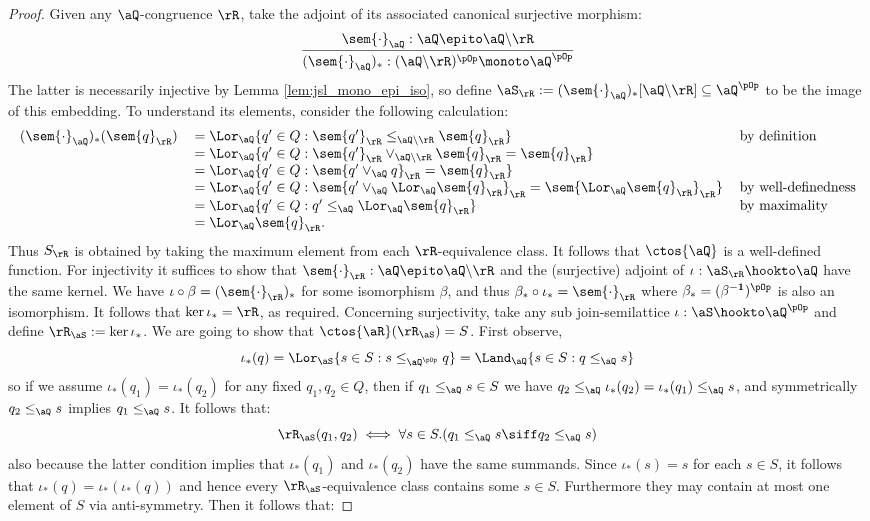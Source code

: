 \documentclass{article}
\begin{document}
\begin{proof}
\smallskip
Given any $\aQ$-congruence $\rR$, take the adjoint of its associated canonical surjective morphism:
\[
\dfrac{\sem{\cdot}_\aQ : \aQ \epito \aQ \backslash \rR }
{(\sem{\cdot}_\aQ)_* : (\aQ \backslash \rR)^{\pOp} \monoto \aQ^{\pOp} }
\]
The latter is necessarily injective by Lemma \ref{lem:jsl_mono_epi_iso}, so define $\aS_\rR := (\sem{\cdot}_\aQ)_*[\aQ \backslash \rR] \subseteq \aQ^{\pOp}$ to be the image of this embedding. To understand its elements, consider the following  calculation:
\[
\begin{tabular}{lll}
$(\sem{\cdot}_\aQ)_*(\sem{q}_\rR)$
&
$= \Lor_\aQ \{ q' \in Q : \sem{q'}_\rR \leq_{\aQ\backslash\rR} \sem{q}_\rR \}$
& by definition
\\&
$= \Lor_\aQ \{ q' \in Q : \sem{q'}_\rR \lor_{\aQ\backslash\rR} \sem{q}_\rR = \sem{q}_\rR \}$
\\&
$= \Lor_\aQ \{ q' \in Q : \sem{q' \lor_\aQ q}_\rR = \sem{q}_\rR \}$
\\&
$= \Lor_\aQ \{ q' \in Q: \sem{q' \lor_\aQ \Lor_\aQ \sem{q}_\rR}_\rR = \sem{\Lor_\aQ \sem{q}_\rR}_\rR  \}$
& by well-definedness
\\&
$= \Lor_\aQ \{ q' \in Q: q' \leq_\aQ \Lor_\aQ \sem{q}_\rR  \}$
& by maximality
\\&
$= \Lor_\aQ \sem{q}_\rR$.
\end{tabular}
\]
Thus $S_\rR$ is obtained by taking the maximum element from each $\rR$-equivalence class. It follows that $\ctos{\aQ}$ is a well-defined function. For injectivity it suffices to show that $\sem{\cdot}_\rR : \aQ \epito \aQ\backslash\rR$ and the (surjective) adjoint of $\iota : \aS_\rR \hookto \aQ$ have the same kernel. We have $\iota \circ \beta = (\sem{\cdot}_\rR)_*$ for some isomorphism $\beta$, and thus $\beta_* \circ \iota_* = \sem{\cdot}_\rR$ where $\beta_* = (\beta^{\bf-1})^{\pOp}$ is also an isomorphism. It follows that $\ker{\iota_*} = \rR$, as required. Concerning surjectivity, take any sub join-semilattice $\iota : \aS \hookto \aQ^{\pOp}$ and define $\rR_\aS := \ker \iota_*$. We are going to show that $\ctos{\aR}(\rR_\aS) = S$. First observe,
\[
\iota_*(q) 
= \Lor_\aS \{ s \in S : s \leq_{\aQ^{\pOp}} q \}
= \Land_\aQ \{ s \in S : q \leq_\aQ s \}
\]
so if we assume $\iota_*(q_1) = \iota_*(q_2)$ for any fixed $q_1, q_2 \in Q$, then if $q_1 \leq_\aQ s \in S$ we have $q_2 \leq_\aQ \iota_*(q_2) = \iota_*(q_1) \leq_\aQ s$, and symmetrically $q_2 \leq_\aQ s$ implies $q_1 \leq_\aQ s$. It follows that:
\[
\rR_\aS(q_1,q_2) \iff \forall s \in S.(q_1 \leq_\aQ s \siff q_2 \leq_\aQ s)
\]
also because the latter condition implies that $\iota_*(q_1)$ and $\iota_*(q_2)$ have the same summands. Since  $\iota_*(s) = s$ for each $s \in S$, it follows that $\iota_*(q) = \iota_*(\iota_*(q))$ and hence every $\rR_\aS$-equivalence class contains some $s \in S$. Furthermore they may contain at most one element of $S$ via anti-symmetry. Then it follows that:

\end{proof}
\end{document}

